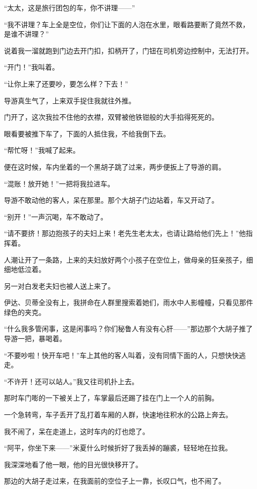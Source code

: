 \par “太太，这是旅行团包的车，你不讲理——”
\par “我不讲理？车上全是空位，你们让下面的人泡在水里，眼看路要断了竟然不救，是谁不讲理？”
\par 说着我一溜就跑到门边去开门扣，扣柄开了，门钮在司机旁边控制中，无法打开。
\par “开门！”我叫着。
\par “让你上来了还要吵，要怎么样？下去！”
\par 导游真生气了，上来双手捉住我就往外推。
\par 门开了，这次我拉不住他的衣襟，双臂被他铁钳般的大手掐得死死的。
\par 眼看要被推下车了，下面的人抵住我，不给我倒下去。
\par “帮忙呀！”我喊了起来。
\par 便在这时候，车内坐着的一个黑胡子跳了过来，两步便扳上了导游的肩。
\par “混账！放开她！”一把将我拉进车。
\par 导游不敢动他的客人，呆在那里。那个大胡子门边站着，车又开动了。
\par “别开！”一声沉喝，车不敢动了。
\par “请不要挤！那边抱孩子的夫妇上来！老先生老太太，也请让路给他们先上！”他指挥着。
\par 人潮让开了一条路，上来的夫妇放好两个小孩子在空位上，做母亲的狂亲孩子，细细地低泣着。
\par 另一对白发老夫妇也被人送上来了。
\par 伊达、贝蒂全没有上，我拼命在人群里搜索着她们，雨水中人影幢幢，只看见那件绿色的夹克。
\par “什么我多管闲事，这是闲事吗？你们秘鲁人有没有心肝——”那边那个大胡子推了导游一把，暴喝着。
\par “不要吵啦！快开车吧！”车上其他的客人叫着，没有同情下面的人，只想快快逃走。
\par “不许开！还可以站人。”我又往司机扑上去。
\par 那时车门嘭的一下被关上了，车掌最后还踢了挂在门上一个人的前胸。
\par 一个急转弯，车子丢开了乱打着车厢的人群，快速地往积水的公路上奔去。
\par 我不闹了，呆在走道上，这时车内的灯也熄了。
\par “阿平，你坐下来——”米夏什么时候折好了我丢掉的蹦裘，轻轻地在拉我。
\par 我深深地看了他一眼，他的目光很快移开了。
\par 那边的大胡子走过来，在我面前的空位子上一靠，长叹口气，也不闹了。
